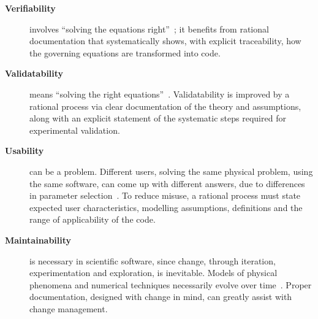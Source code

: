 \documentclass[12pt]{article}
\begin{document}
\begin{description}%

\item [\textbf{Verifiability}] involves ``solving the equations
  right''~\cite[p.~23]{Roache1998}; it benefits from rational documentation
  that systematically shows, with explicit traceability, how the governing
  equations are transformed into code.

\item [\textbf{Validatability}] means ``solving the right
  equations''~\cite[p.~23]{Roache1998}.  Validatability is improved by a
  rational process via clear documentation of the theory and assumptions, along
  with an explicit statement of the systematic steps required for experimental
  validation.



\item [\textbf{Usability}] can be a problem.  Different users, solving the same
  physical problem, using the same software, can come up with different answers,
  due to differences in parameter selection~\cite[p.~370]{Roache1998}.  To
  reduce misuse, a rational process must state expected user characteristics,
  modelling assumptions, definitions and the range of applicability of the code.

\item [\textbf{Maintainability}] is necessary in scientific software, since change,
  through iteration, experimentation and exploration, is inevitable.  Models of
  physical phenomena and numerical techniques necessarily evolve over
  time~\cite{CarverEtAl2007, SegalAndMorris2008}.  Proper documentation,
  designed with change in mind, can greatly assist with change management.%


\end{description}
\end{document}
